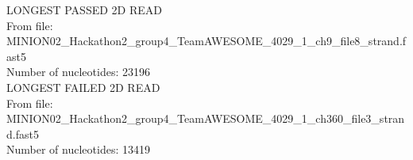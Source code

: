 
LONGEST PASSED 2D READ\\
From file: MINION02\_Hackathon2\_group4\_TeamAWESOME\_4029\_1\_ch9\_file8\_strand.fast5\\
Number of nucleotides: 23196\\

LONGEST FAILED 2D READ\\
From file: MINION02\_Hackathon2\_group4\_TeamAWESOME\_4029\_1\_ch360\_file3\_strand.fast5\\
Number of nucleotides: 13419\\

